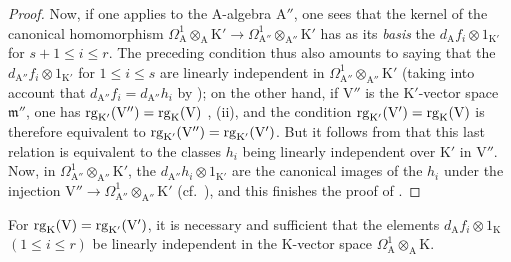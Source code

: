 \begin{proof}
Now, if one applies  to the $\mathrm{A}$-algebra $\mathrm{A}''$, one sees that the kernel of the canonical homomorphism $\Omega^1_\mathrm{A}\otimes_\mathrm{A}\mathrm{K}'\to\Omega^1_{\mathrm{A}''}\otimes_{\mathrm{A}''}\mathrm{K}'$ has as its \emph{basis} the $d_\mathrm{A}f_i\otimes 1_{\mathrm{K}'}$ for $s+1\leq i\leq r$.
The preceding condition thus also amounts to saying that the $d_{\mathrm{A}''}f_i\otimes 1_{\mathrm{K}'}$ for $1\leq i\leq s$ are linearly independent in $\Omega^1_{\mathrm{A}''}\otimes_{\mathrm{A}''}\mathrm{K}'$ (taking into account that $d_{\mathrm{A}''}f_i=d_{\mathrm{A}''}h_i$ by );
on the other hand, if $\mathrm{V}''$ is the $\mathrm{K}'$-vector space $\mathfrak{m}''$, one has $\operatorname{rg}_{\mathrm{K}'}(\mathrm{V}'')=\operatorname{rg}_\mathrm{K}(\mathrm{V})$ , (ii), and the condition $\operatorname{rg}_{\mathrm{K}'}(\mathrm{V}')=\operatorname{rg}_\mathrm{K}(\mathrm{V})$ is therefore equivalent to $\operatorname{rg}_{\mathrm{K}'}(\mathrm{V}'')=\operatorname{rg}_{\mathrm{K}'}(\mathrm{V}')$.
But it follows from  that this last relation is equivalent to the classes $h_i$
being linearly independent over $\mathrm{K}'$ in $\mathrm{V}''$.
Now, in $\Omega^1_{\mathrm{A}''}\otimes_{\mathrm{A}''}\mathrm{K}'$, the $d_{\mathrm{A}''}h_i\otimes 1_{\mathrm{K}'}$ are the canonical images  of the $h_i$ under the injection $\mathrm{V}''\to\Omega^1_{\mathrm{A}''}\otimes_{\mathrm{A}''}\mathrm{K}'$ (cf.~), and this finishes the proof of .
\end{proof}

\begin{corollary}[22.4.7.4]
\label{0.22.4.7.4}
For $\operatorname{rg}_\mathrm{K}(\mathrm{V})=\operatorname{rg}_{\mathrm{K}'}(\mathrm{V}')$, it is necessary and sufficient that the elements $d_\mathrm{A}f_i\otimes 1_\mathrm{K}$ $(1\leq i\leq r)$ be linearly independent in the $\mathrm{K}$-vector space $\Omega^1_\mathrm{A}\otimes_\mathrm{A}\mathrm{K}$.
\end{corollary}

